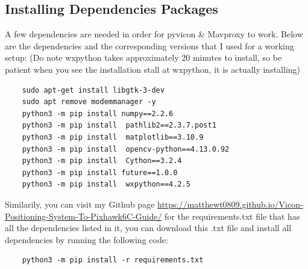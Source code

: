 


\subsection{Installing Dependencies Packages}
A few dependencies are needed in order for pyvicon \& Mavproxy to work. Below are the dependencies and the corresponding versions that I used for a working setup: (Do note wxpython takes approximately 20 minutes to install, so be patient when you see the installation stall at wxpython, it is actually installing)

\begin{lstlisting}
    sudo apt-get install libgtk-3-dev 
    sudo apt remove modemmanager -y
    python3 -m pip install numpy==2.2.6
    python3 -m pip install  pathlib2==2.3.7.post1
    python3 -m pip install  matplotlib==3.10.9
    python3 -m pip install  opencv-python==4.13.0.92
    python3 -m pip install  Cython==3.2.4
    python3 -m pip install future==1.0.0
    python3 -m pip install  wxpython==4.2.5
\end{lstlisting}

Similarily, you can visit my Github page \href{https://matthewt0809.github.io/Vicon-Positioning-System-To-Pixhawk6C-Guide/}{https://matthewt0809.github.io/Vicon-Positioning-System-To-Pixhawk6C-Guide/} for the requirements.txt file that has all the dependencies listed in it, you can download this .txt file and install all dependencies by running the following code:
\begin{lstlisting}
    python3 -m pip install -r requirements.txt
\end{lstlisting}

